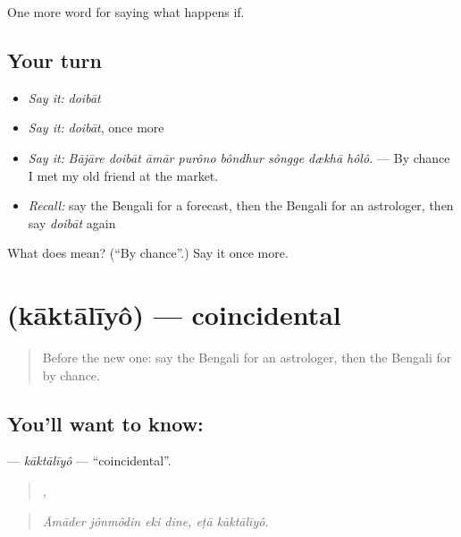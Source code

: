 \begin{grammarlens}[title={What you've built}]
One more word for saying what happens if.
\end{grammarlens}

\subsection*{Your turn}
\begin{itemize}
\raggedright
  \item \emph{Say it:} \emph{doibāt}
  \item \emph{Say it:} \emph{doibāt}, once more
  \item \emph{Say it:} \emph{Bājāre doibāt āmār purôno bôndhur sôngge dækhā hôlô.} — By chance I met my old friend at the market.
  \item \emph{Recall:} say the Bengali for a forecast, then the Bengali for an astrologer, then say \emph{doibāt} again
\end{itemize}

\begin{tcolorbox}[breakable,colback=teal!4,colframe=teal!35!black,title={Before you move on}]
What does  mean? (\textquotedblleft{}By chance\textquotedblright{}.) Say it once more.
\end{tcolorbox}
\section[\texorpdfstring{\bn{কাকতালীয়} (kāktālīyô)}{কাকতালীয় (kāktālīyô)}]{ (kāktālīyô) — coincidental}

\label{lesson:BN-C533-kaktaliyo}



\begin{quote}
Before the new one: say the Bengali for an astrologer, then the Bengali for by chance.
\end{quote}

\subsection*{You'll want to know: }
\textbf{} — \emph{kāktālīyô} — \textquotedblleft{}coincidental\textquotedblright{}.

\begin{quote}
   ,  
\end{quote}

\begin{quote}
\emph{Āmāder jônmôdin eki dine, eṭā kāktālīyô.}
\end{quote}


